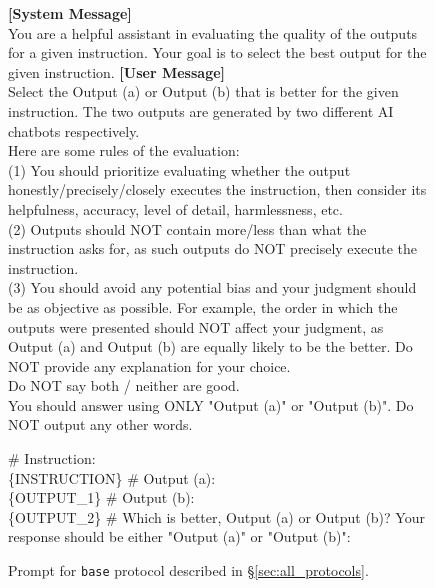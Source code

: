 \clearpage
\begin{figure*}[t!]
\begin{tcolorbox}[colback=black!3!white, colframe=black!70!white, title=Base, fontupper=\footnotesize, fonttitle=\footnotesize]
\textbf{[System Message]} \\
You are a helpful assistant in evaluating the quality of the outputs for a given instruction. Your goal is to select the best output for the given instruction.
\newline
\newline
\textbf{[User Message]}\\
Select the Output (a) or Output (b) that is better for the given instruction. The two outputs are generated by two different AI chatbots respectively. \\
\newline
Here are some rules of the evaluation: \\
(1) You should prioritize evaluating whether the output honestly/precisely/closely executes the instruction, then consider its helpfulness, accuracy, level of detail, harmlessness, etc. \\
(2) Outputs should NOT contain more/less than what the instruction asks for, as such outputs do NOT precisely execute the instruction.\\
(3) You should avoid any potential bias and your judgment should be as objective as possible. For example, the order in which the outputs were presented should NOT affect your judgment, as Output (a) and Output (b) are equally likely to be the better.
\newline
\newline
Do NOT provide any explanation for your choice.\\
Do NOT say both / neither are good.\\
You should answer using ONLY "Output (a)" or "Output (b)". Do NOT output any other words.\\
\newline

\# Instruction: \\
\{INSTRUCTION\}
\newline
\newline
\# Output (a): \\
\{OUTPUT\_1\}
\newline
\newline
\# Output (b): \\
\{OUTPUT\_2\}
\newline
\newline
\# Which is better, Output (a) or Output (b)? Your response should be either "Output (a)" or "Output (b)":
\end{tcolorbox}
\caption{Prompt for \texttt{base} protocol described in \S\ref{sec:all_protocols}.}
\label{fig:prompt_base}
\end{figure*}


